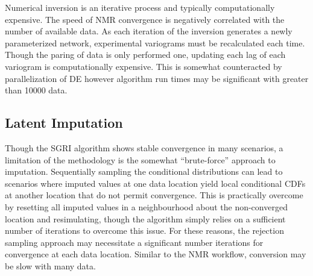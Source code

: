 Numerical inversion is an iterative process and typically computationally expensive. The speed of \gls{NMR} convergence is negatively correlated with the number of available data. As each iteration of the inversion generates a newly parameterized network, experimental variograms must be recalculated each time. Though the paring of data is only performed one, updating each lag of each variogram is computationally expensive. This is somewhat counteracted by parallelization of \gls{DE} however algorithm run times may be significant with greater than 10000 data.


\subsection{Latent Imputation}
\label{subsec:07impute}

Though the \gls{SGRI} algorithm shows stable convergence in many scenarios, a limitation of the methodology is the somewhat ``brute-force'' approach to imputation. Sequentially sampling the conditional distributions can lead to scenarios where imputed values at one data location yield local conditional \glspl{CDF} at another location that do not permit convergence. This is practically overcome by resetting all imputed values in a neighbourhood about the non-converged location and resimulating, though the algorithm simply relies on a sufficient number of iterations to overcome this issue. For these reasons, the rejection sampling approach may necessitate a significant number iterations for convergence at each data location. Similar to the \gls{NMR} workflow, conversion may be slow with many data.

